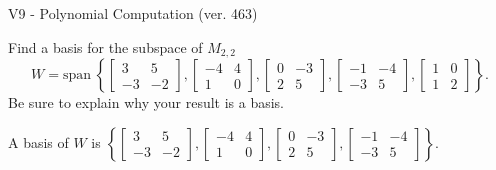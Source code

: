 \begin{exercise}
  \begin{exerciseTitle}V9 - Polynomial Computation (ver. 463)\end{exerciseTitle}
  \begin{exerciseStatement}
    Find a basis for the subspace of \(M_{2,2}\) 
\[W=\mathrm{span}\ \left\{\left[\begin{array}{cc}
3 & 5 \\
-3 & -2
\end{array}\right] , \left[\begin{array}{cc}
-4 & 4 \\
1 & 0
\end{array}\right] , \left[\begin{array}{cc}
0 & -3 \\
2 & 5
\end{array}\right] , \left[\begin{array}{cc}
-1 & -4 \\
-3 & 5
\end{array}\right] , \left[\begin{array}{cc}
1 & 0 \\
1 & 2
\end{array}\right]\right\}.\]
 Be sure to explain why your result is a basis.


  \end{exerciseStatement}
  \begin{exerciseAnswer}
   A basis of \(W\) is  \(\left\{\left[\begin{array}{cc}
3 & 5 \\
-3 & -2
\end{array}\right] , \left[\begin{array}{cc}
-4 & 4 \\
1 & 0
\end{array}\right] , \left[\begin{array}{cc}
0 & -3 \\
2 & 5
\end{array}\right] , \left[\begin{array}{cc}
-1 & -4 \\
-3 & 5
\end{array}\right]\right\}\).
  


  \end{exerciseAnswer}
\end{exercise}